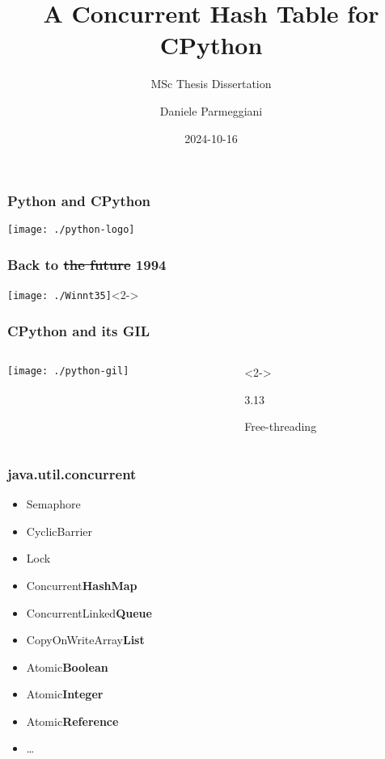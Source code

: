 \documentclass[aspectratio=169]{beamer}
\title{A Concurrent Hash Table for CPython}
\subtitle{MSc Thesis Dissertation}
\date{2024-10-16}
\institute{Università degli Studi di Trento, DISI}
\author{Daniele Parmeggiani}
\begin{document}

\inserttitleframe


\begin{frame}
    \frametitle{Python and CPython}
    \begin{center}
        \texttt{[image: ./python-logo]}
    \end{center}
\end{frame}

\begin{frame}
    \frametitle{Back to \sout{the future} 1994}
    \begin{center}
        \texttt{[image: ./Winnt35]}<2->
    \end{center}
\end{frame}

\begin{frame}
    \frametitle{CPython and its GIL}

    \begin{columns}
        \begin{column}{0.5\textwidth}
            \centering\texttt{[image: ./python-gil]}
        \end{column}
        \begin{column}{0.5\textwidth}<2->
            \begin{center}
                \Huge{3.13}

                \Large{Free-threading}
            \end{center}
        \end{column}
    \end{columns}
\end{frame}

\begin{frame}
    \frametitle{java.util.concurrent}

    \begin{itemize}
        \item Semaphore \checked
        \item CyclicBarrier \checked
        \item Lock \checked
        \item Concurrent{\textbf{HashMap}}
        \item ConcurrentLinked{\textbf{Queue}}
        \item CopyOnWriteArray{\textbf{List}}
        \item Atomic{\textbf{Boolean}}
        \item Atomic{\textbf{Integer}}
        \item Atomic{\textbf{Reference}}
        \item \ldots
    \end{itemize}
\end{frame}
\end{document}
